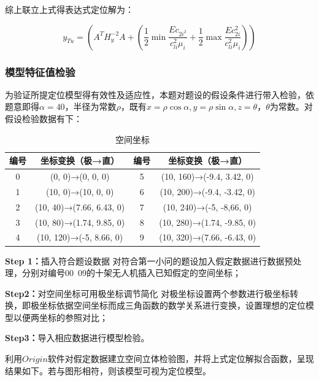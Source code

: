 综上联立上式得表达式定位解为：

\begin{equation}
    y_{Tu}=
    \left (
        A^TH_y^{-2}A
        +
        \left (
            \frac{1}{2}\min\frac{E{c_{2i^2}}}{c_{li}^2\mu_i} +
            \frac{1}{2}\max\frac{E{c_{2i}^2}}{c_{li}^2\mu_i}
        \right )
    \right )
\end{equation}

\subsubsection{模型特征值检验}

为验证所提定位模型得有效性及适应性，本题对题设的假设条件进行带入检验，依题意即得$\alpha=40$，半径为常数$\rho$，既有$x=\rho\cos\alpha, y=\rho\sin\alpha,z=\theta$，$\theta$为常数。对假设检验数据有下：

\begin{table}[htp!]
    \centering
    \caption{空间坐标}
    \begin{tabular}{cccc}
        \hline
        编号&   坐标变换（极→直）&   编号&   坐标变换（极→直）  \\
        \hline

        0&  (0, 0)→(0, 0, 0)&  5& (10, 160)→(-9.4, 3.42, 0)   \\
        1&  (10, 0)→(10, 0, 0)&    6&  (10, 200)→(-9.4, -3.42, 0)    \\
        2& (10, 40)→(7.66, 6.43, 0)&    7&  (10, 240)→(-5, -8,66, 0)    \\
        3& (10, 80)→(1.74, 9.85, 0)&   8&  (10, 280)→(1.74, -9.85, 0)  \\
        4&  (10, 120)→(-5, 8.66, 0)&    9&  (10, 320)→(7.66, -6.43, 0)  \\

        \hline
    \end{tabular}
\end{table}

\textbf{Step 1：}插入符合题设数据
对符合第一小问的题设加入假定数据进行数据预处理，分别对编号00~09的十架无人机插入已知假定的空间坐标；

\textbf{Step2：}对空间坐标可用极坐标调节简化
对极坐标设置两个参数进行极坐标转换，即极坐标依据空间坐标而成三角函数的数学关系进行变换，设置理想的定位模型以便两坐标的参照对比；\cite{wangnengbinShujukuxitongjiaocheng}

\textbf{Step3：}导入相应数据进行模型检验。

利用$Origin$软件对假定数据建立空间立体检验图，并将上式定位解拟合函数，呈现结果如下。若与图形相符，则该模型可视为定位模型。

